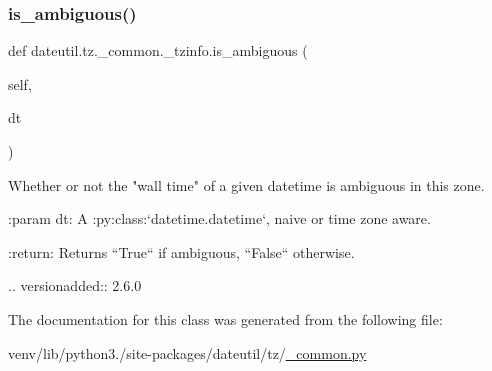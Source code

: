 \subsubsection{\texorpdfstring{is\+\_\+ambiguous()}{is\_ambiguous()}}
{\footnotesize\ttfamily def dateutil.\+tz.\+\_\+common.\+\_\+tzinfo.\+is\+\_\+ambiguous (\begin{DoxyParamCaption}\item[{}]{self,  }\item[{}]{dt }\end{DoxyParamCaption})}

\begin{DoxyVerb}Whether or not the "wall time" of a given datetime is ambiguous in this
zone.

:param dt:
    A :py:class:`datetime.datetime`, naive or time zone aware.


:return:
    Returns ``True`` if ambiguous, ``False`` otherwise.

.. versionadded:: 2.6.0
\end{DoxyVerb}
 

The documentation for this class was generated from the following file\+:\begin{DoxyCompactItemize}
\item 
venv/lib/python3./site-\/packages/dateutil/tz/\hyperlink{tz_2__common_8py}{\+\_\+common.\+py}\end{DoxyCompactItemize}
